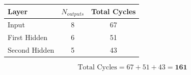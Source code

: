 \documentclass{article}
\begin{document}
\begin{table}[H]
    \centering
    \begin{tabular}{|l|c|c|}
        \hline
        \textbf{Layer} & \textbf{$N_{outputs}$} & \textbf{Total Cycles} \\
        \hline
        Input & 8 & 67 \\
        \hline
        First Hidden & 6 & 51 \\
        \hline
        Second Hidden & 5 & 43 \\
        \hline
    \end{tabular}
    \label{tab:naive-cycles}
\end{table}

\begin{equation}
    \text{Total Cycles} = 67 + 51 + 43 = \textbf{161}
\end{equation}
\end{document}
